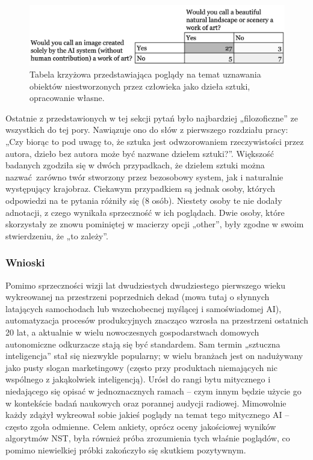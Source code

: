 \documentclass[12pt]{article}
\begin{document}
\begin{figure}[H]
    \centering
    \includegraphics[width=\textwidth]{p11}
    \caption{Tabela krzyżowa przedstawiająca poglądy na temat uznawania obiektów niestworzonych przez człowieka jako dzieła sztuki, opracowanie własne.}
    \label{fig:28}
\end{figure}

Ostatnie z przedstawionych w tej sekcji pytań było najbardziej „filozoficzne” ze wszystkich do tej pory. Nawiązuje ono do słów z pierwszego rozdziału pracy: „Czy biorąc to pod uwagę to, że sztuka jest odwzorowaniem rzeczywistości przez autora, dzieło bez autora może być nazwane dziełem sztuki?”. Większość badanych zgodziła się w dwóch przypadkach, że dziełem sztuki można nazwać zarówno twór stworzony przez bezosobowy system, jak i naturalnie występujący krajobraz. Ciekawym przypadkiem są jednak osoby, których odpowiedzi na te pytania różniły się (8 osób). Niestety osoby te nie dodały adnotacji, z czego wynikała sprzeczność w ich poglądach. Dwie osoby, które skorzystały ze znowu pominiętej w macierzy opcji „other”, były zgodne w swoim stwierdzeniu, że „to zależy”.

\subsubsection{Wnioski}

\indent

Pomimo sprzeczności wizji lat dwudziestych dwudziestego pierwszego wieku wykreowanej na przestrzeni poprzednich dekad (mowa tutaj o słynnych latających samochodach lub wszechobecnej myślącej i samoświadomej AI), automatyzacja procesów produkcyjnych znacząco wzrosła na przestrzeni ostatnich 20 lat, a aktualnie w wielu nowoczesnych gospodarstwach domowych autonomiczne odkurzacze stają się być standardem. Sam termin „sztuczna inteligencja” stał się niezwykle popularny; w wielu branżach jest on nadużywany jako pusty slogan marketingowy (często przy produktach niemających nic wspólnego z jakąkolwiek inteligencją). Urósł do rangi bytu mitycznego i niedającego się opisać w jednoznacznych ramach – czym innym będzie użycie go w kontekście badań naukowych oraz porannej audycji radiowej. Mimowolnie każdy zdążył wykreował sobie jakieś poglądy na temat tego mitycznego AI – często zgoła odmienne. Celem ankiety, oprócz oceny jakościowej wyników algorytmów NST, była również próba zrozumienia tych właśnie poglądów, co pomimo niewielkiej próbki zakończyło się skutkiem pozytywnym.
\end{document}
